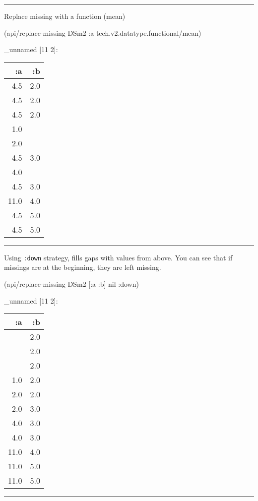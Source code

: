 \documentclass[]{article}
\newenvironment{Shaded}{\begin{snugshade}}{\end{snugshade}}
\newcommand{\VariableTok}[1]{\textcolor[rgb]{0.00,0.00,0.00}{#1}}
\newcommand{\AttributeTok}[1]{\textcolor[rgb]{0.77,0.63,0.00}{#1}}
\newcommand{\NormalTok}[1]{#1}
\begin{document}
\begin{center}\rule{0.5\linewidth}{0.5pt}\end{center}

Replace missing with a function (mean)

\begin{Shaded}
\begin{Highlighting}[]
\NormalTok{(api/replace-missing DSm2 }\AttributeTok{:a}\NormalTok{ tech.v2.datatype.functional/mean)}
\end{Highlighting}
\end{Shaded}

\_unnamed {[}11 2{]}:

\begin{longtable}[]{@{}rr@{}}
\toprule
:a & :b\tabularnewline
\midrule
\endhead
4.5 & 2.0\tabularnewline
4.5 & 2.0\tabularnewline
4.5 & 2.0\tabularnewline
1.0 &\tabularnewline
2.0 &\tabularnewline
4.5 & 3.0\tabularnewline
4.0 &\tabularnewline
4.5 & 3.0\tabularnewline
11.0 & 4.0\tabularnewline
4.5 & 5.0\tabularnewline
4.5 & 5.0\tabularnewline
\bottomrule
\end{longtable}

\begin{center}\rule{0.5\linewidth}{0.5pt}\end{center}

Using \texttt{:down} strategy, fills gaps with values from above. You
can see that if missings are at the beginning, they are left missing.

\begin{Shaded}
\begin{Highlighting}[]
\NormalTok{(api/replace-missing DSm2 [}\AttributeTok{:a} \AttributeTok{:b}\NormalTok{] }\VariableTok{nil} \AttributeTok{:down}\NormalTok{)}
\end{Highlighting}
\end{Shaded}

\_unnamed {[}11 2{]}:

\begin{longtable}[]{@{}rr@{}}
\toprule
:a & :b\tabularnewline
\midrule
\endhead
& 2.0\tabularnewline
& 2.0\tabularnewline
& 2.0\tabularnewline
1.0 & 2.0\tabularnewline
2.0 & 2.0\tabularnewline
2.0 & 3.0\tabularnewline
4.0 & 3.0\tabularnewline
4.0 & 3.0\tabularnewline
11.0 & 4.0\tabularnewline
11.0 & 5.0\tabularnewline
11.0 & 5.0\tabularnewline
\bottomrule
\end{longtable}

\begin{center}\rule{0.5\linewidth}{0.5pt}\end{center}
\end{document}
